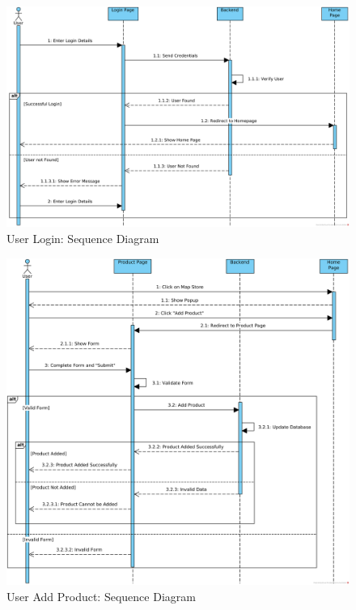 \begin{figure}[H]
    \centering
    \includegraphics[width = \linewidth]{media/Sequence/User_Login.png}
	\caption{User Login: Sequence Diagram}
	\label{fig:User_Login}
\end{figure}


\begin{figure}[H]
    \centering
    \includegraphics[width = \linewidth]{media/Sequence/User_Add_Product.png}
	\caption{User Add Product: Sequence Diagram}
	\label{fig:User_Add_Product}
\end{figure}

